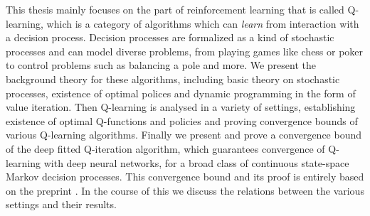 
This thesis mainly focuses on the part of reinforcement learning that is called
Q-learning, which is a category of algorithms which can \emph{learn} from
interaction with a decision process.
Decision processes are formalized as a kind of stochastic processes and
can model diverse problems, from playing games like 
chess or poker to control problems such
as balancing a pole and more.
We present the background theory for these algorithms,
including basic theory on stochastic processes,
existence of optimal polices and
dynamic programming in the form of value iteration.
Then Q-learning is analysed in a variety of settings,
establishing existence of optimal Q-functions and policies
and proving convergence bounds of various Q-learning algorithms.
Finally we present and prove a convergence bound of the
deep fitted Q-iteration algorithm,
which guarantees convergence of Q-learning with deep neural networks,
for a broad class of continuous state-space Markov decision processes.
This convergence bound and its proof is entirely based on
the preprint .
In the course of this we discuss the relations between the various settings
and their results.
